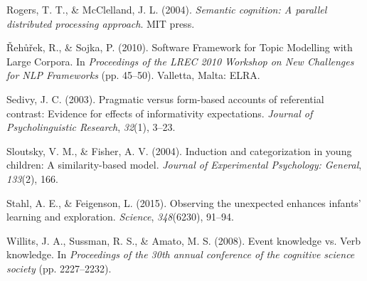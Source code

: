 \documentclass[10pt, letterpaper]{article}
\begin{document}
\leavevmode\hypertarget{ref-rogers2004}{}%
Rogers, T. T., \& McClelland, J. L. (2004). \emph{Semantic cognition: A
parallel distributed processing approach}. MIT press.

\leavevmode\hypertarget{ref-rehurek2010}{}%
Řehůřek, R., \& Sojka, P. (2010). Software Framework for Topic Modelling
with Large Corpora. In \emph{Proceedings of the LREC 2010 Workshop on
New Challenges for NLP Frameworks} (pp. 45--50). Valletta, Malta: ELRA.

\leavevmode\hypertarget{ref-sedivy2003}{}%
Sedivy, J. C. (2003). Pragmatic versus form-based accounts of
referential contrast: Evidence for effects of informativity
expectations. \emph{Journal of Psycholinguistic Research}, \emph{32}(1),
3--23.

\leavevmode\hypertarget{ref-sloutsky2004}{}%
Sloutsky, V. M., \& Fisher, A. V. (2004). Induction and categorization
in young children: A similarity-based model. \emph{Journal of
Experimental Psychology: General}, \emph{133}(2), 166.

\leavevmode\hypertarget{ref-stahl2015}{}%
Stahl, A. E., \& Feigenson, L. (2015). Observing the unexpected enhances
infants' learning and exploration. \emph{Science}, \emph{348}(6230),
91--94.

\leavevmode\hypertarget{ref-willits2008}{}%
Willits, J. A., Sussman, R. S., \& Amato, M. S. (2008). Event knowledge
vs. Verb knowledge. In \emph{Proceedings of the 30th annual conference
of the cognitive science society} (pp. 2227--2232).


\end{document}

